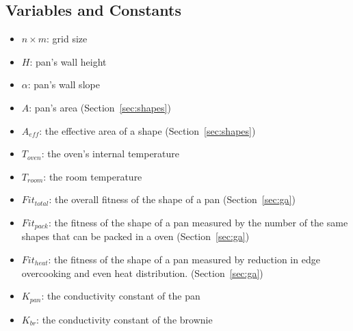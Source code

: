 \documentclass[12pt,draft]{reedmcm}
\begin{document}
\subsection{Variables and Constants}
\begin{itemize}
  \item $n\times m$: grid size
  \item $H$: pan's wall height
  \item $\alpha$: pan's wall slope
  \item $A$: pan's area (Section~\ref{sec:shapes})
  \item $A_{eff}$: the effective area of a shape (Section~\ref{sec:shapes})
  \item $T_{oven}$: the oven's internal temperature
  \item $T_{room}$: the room temperature
  \item $Fit_{total}$: the overall fitness of the shape of a pan (Section~\ref{sec:ga})
  \item $Fit_{pack}$: the fitness of the shape of a pan measured by the number of the same shapes that can be packed in a oven (Section~\ref{sec:ga})
  \item $Fit_{heat}$: the fitness of the shape of a pan measured by reduction in edge overcooking and even heat distribution. (Section~\ref{sec:ga})
  \item $K_{pan}$: the conductivity constant of the pan
  \item $K_{br}$: the conductivity constant of the brownie
\end{itemize}
\end{document}

